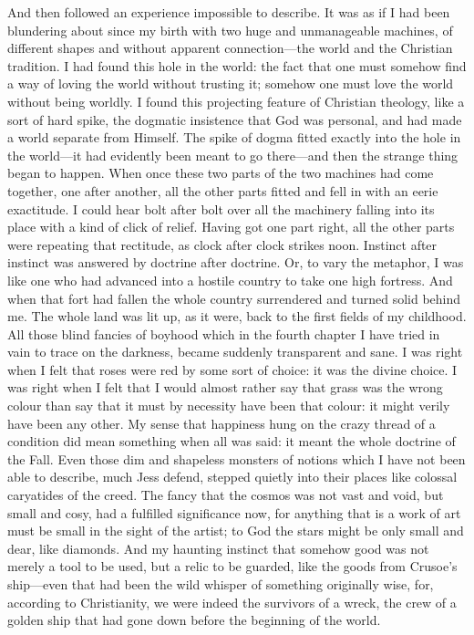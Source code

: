\documentclass{book}
\begin{document}
And then followed an experience impossible to describe. It was as if I had been blundering about since my birth with two huge and unmanageable machines, of different shapes and without apparent connection—the world and the Christian tradition. I had found this hole in the world: the fact that one must somehow find a way of loving the world without trusting it; somehow one must love the world without being worldly. I found this projecting feature of Christian theology, like a sort of hard spike, the dogmatic insistence that God was personal, and had made a world separate from Himself. The spike of dogma fitted exactly into the hole in the world—it had evidently been meant to go there—and then the strange thing began to happen. When once these two parts of the two machines had come together, one after another, all the other parts fitted and fell in with an eerie exactitude. I could hear bolt after bolt over all the machinery falling into its place with a kind of click of relief. Having got one part right, all the other parts were repeating that rectitude, as clock after clock strikes noon. Instinct after instinct was answered by doctrine after doctrine. Or, to vary the metaphor, I was like one who had advanced into a hostile country to take one high fortress. And when that fort had fallen the whole country surrendered and turned solid behind me. The whole land was lit up, as it were, back to the first fields of my childhood. All those blind fancies of boyhood which in the fourth chapter I have tried in vain to trace on the darkness, became suddenly transparent and sane. I was right when I felt that roses were red by some sort of choice: it was the divine choice. I was right when I felt that I would almost rather say that grass was the wrong colour than say that it must by necessity have been that colour: it might verily have been any other. My sense that happiness hung on the crazy thread of a condition did mean something when all was said: it meant the whole doctrine of the Fall. Even those dim and shapeless monsters of notions which I have not been able to describe, much Jess defend, stepped quietly into their places like colossal caryatides of the creed. The fancy that the cosmos was not vast and void, but small and cosy, had a fulfilled significance now, for anything that is a work of art must be small in the sight of the artist; to God the stars might be only small and dear, like diamonds. And my haunting instinct that somehow good was not merely a tool to be used, but a relic to be guarded, like the goods from Crusoe’s ship—even that had been the wild whisper of something originally wise, for, according to Christianity, we were indeed the survivors of a wreck, the crew of a golden ship that had gone down before the beginning of the world.
\end{document}
